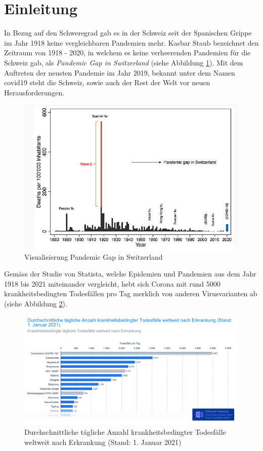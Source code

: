 \section{Einleitung}
In Bezug auf den Schweregrad gab es in der Schweiz seit der Spanischen Grippe im Jahr 1918 keine vergleichbaren Pandemien mehr. Kasbar Staub bezeichnet den Zeitraum von 1918 - 2020, in welchem es keine verheerenden Pandemien für die Schweiz gab, als \textit{Pandemic Gap in Switzerland} (siehe Abbildung \ref{fig:pandemic_gap_switzerland}). Mit dem Auftreten der neusten Pandemie im Jahr 2019, bekannt unter dem Namen \gls{covid19} steht die Schweiz, sowie auch der Rest der Welt vor neuen Herausforderungen.

\begin{figure}[h]
    \includegraphics[width=12cm]{images/pandemic_gap_switzerland.png}
    \centering
    \caption{Visualisierung Pandemic Gap in Switzerland ~\citep{switzerland_pandemic_gap}}
    \label{fig:pandemic_gap_switzerland}
\end{figure}


Gemäss der Studie von Statista, welche Epidemien und Pandemien aus dem Jahr 1918 bis 2021 miteinander vergleicht, hebt sich Corona mit rund 5000 krankheitsbedingten Todesfällen pro Tag merklich von anderen Virusvarianten ab (siehe Abbildung \ref{fig:daily_deaths_due_to_contamination}).

\begin{figure}[h]
    \includegraphics[width=12cm]{images/daily_deaths_after_contamination.png}
    \centering
    \caption{Durchschnittliche tägliche Anzahl krankheitsbedingter Todesfälle weltweit nach Erkrankung (Stand:
1. Januar 2021) ~\citep[S. 6]{worldwide_epidemic_cases_study}}
    \label{fig:daily_deaths_due_to_contamination}
\end{figure}


